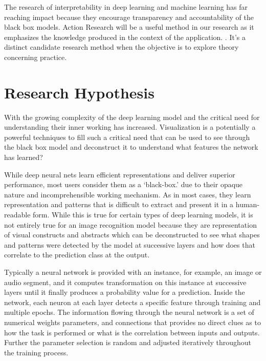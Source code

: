 The research of interpretability in deep learning and machine learning has far reaching impact because they encourage transparency and accountability of the black box models. Action Research will be a useful method in our research as it emphasizes the knowledge produced in the context of the application. \cite{401014119781201}. It’s a distinct candidate research method when the objective is to explore theory concerning practice.

\section{Research Hypothesis}

With the growing complexity of the deep learning model and the critical need for understanding their inner working has increased. Visualization is a potentially a powerful techniques to fill such a critical need that can be used to see through the black box model and deconstruct it to understand what features the network has learned?

While deep neural nets learn efficient representations and deliver superior performance, most users consider them as a ‘black-box.’ due to their opaque nature and incomprehensible working mechanism. As in most cases, they learn representation and patterns that is difficult to extract and present it in a human-readable form. While this is true for certain types of deep learning models, it is not entirely true for an image recognition model because they are representation of visual constructs and abstracts which can be deconstructed to see what shapes and patterns were detected by the model at successive layers \cite{Zeiler} and how does that correlate to the prediction class at the output.

Typically a neural network is provided with an instance, for example, an image or audio segment, and it computes transformation on this instance at successive layers until it finally produces a probability value for a prediction. Inside the network, each neuron at each layer detects a specific feature through training and multiple epochs. The information flowing through the neural network is a set of numerical weights parameters, and connections that provides no direct clues as to how the task is performed or what is the correlation between inputs and outputs. Further the parameter selection is random and adjusted iteratively throughout the training process. %

